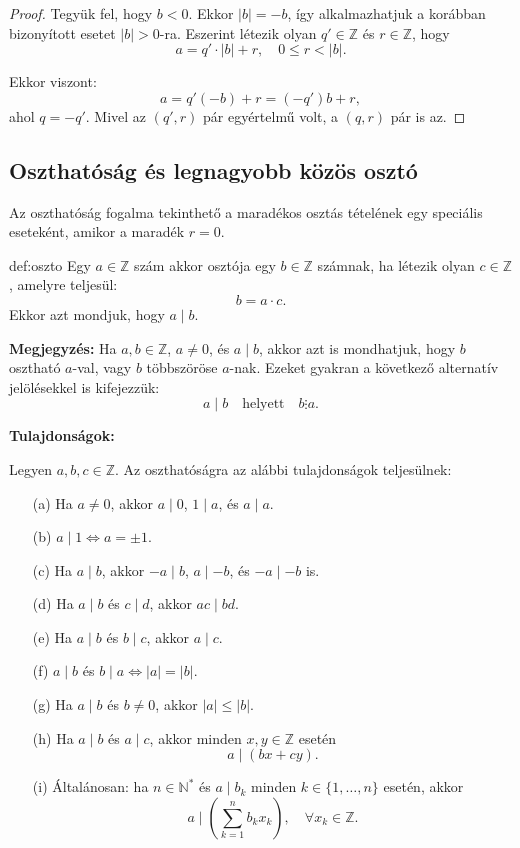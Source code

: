 \begin{proof}
Tegyük fel, hogy $b<0$. Ekkor $|b|=-b$, így alkalmazhatjuk a korábban
bizonyított esetet $|b|>0$-ra. Eszerint létezik olyan $q'\in\mathbb{Z}$
és $r\in\mathbb{Z}$, hogy 
\[
a=q'\cdot|b|+r,\quad0\leq r<|b|.
\]

Ekkor viszont: 
\[
a=q'(-b)+r=(-q')b+r,
\]
ahol $q=-q'$. Mivel az $(q',r)$ pár egyértelmű volt, a $(q,r)$
pár is az.
\end{proof}

\subsection*{Oszthatóság és legnagyobb közös osztó}

Az oszthatóság fogalma tekinthető a maradékos osztás tételének egy
speciális eseteként, amikor a maradék $r=0$.
\begin{definition}{def:oszto}
Egy $a\in\mathbb{Z}$ szám akkor osztója egy $b\in\mathbb{Z}$ számnak,
ha létezik olyan $c\in\mathbb{Z}$, amelyre teljesül: 
\[
b=a\cdot c.
\]
Ekkor azt mondjuk, hogy $a\mid b$.
\end{definition}

\textbf{Megjegyzés:} Ha $a,b\in\mathbb{Z}$, $a\neq0$, és $a\mid b$,
akkor azt is mondhatjuk, hogy $b$ osztható $a$-val, vagy $b$ többszöröse
$a$-nak. Ezeket gyakran a következő alternatív jelölésekkel is kifejezzük:
\[
a\mid b\quad\text{helyett}\quad b\vdots a.
\]

\textbf{Tulajdonságok:}

Legyen $a,b,c\in\mathbb{Z}$. Az oszthatóságra az alábbi tulajdonságok
teljesülnek:
\begin{enumerate}
\item[(a)] Ha $a\neq0$, akkor $a\mid0$, $1\mid a$, és $a\mid a$. 
\item[(b)] $a\mid1\iff a=\pm1$. 
\item[(c)] Ha $a\mid b$, akkor $-a\mid b$, $a\mid-b$, és $-a\mid-b$ is. 
\item[(d)] Ha $a\mid b$ és $c\mid d$, akkor $ac\mid bd$. 
\item[(e)] Ha $a\mid b$ és $b\mid c$, akkor $a\mid c$. 
\item[(f)] $a\mid b$ és $b\mid a\iff|a|=|b|$. 
\item[(g)] Ha $a\mid b$ és $b\neq0$, akkor $|a|\leq|b|$. 
\item[(h)] Ha $a\mid b$ és $a\mid c$, akkor minden $x,y\in\mathbb{Z}$ esetén
\[
a\mid(bx+cy).
\]
\item[(i)] Általánosan: ha $n\in\mathbb{N}^{*}$ és $a\mid b_{k}$ minden $k\in\{1,\dots,n\}$
esetén, akkor 
\[
a\mid\left(\sum_{k=1}^{n}b_{k}x_{k}\right),\quad\forall x_{k}\in\mathbb{Z}.
\]
\end{enumerate}

